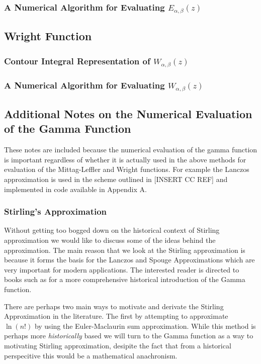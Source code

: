 \subsubsection{A Numerical Algorithm for Evaluating $ E_{\alpha, \beta}(z) $}
\subsection{Wright Function}
\subsubsection{Contour Integral Representation of $ W_{\alpha, \beta}(z) $}

\subsubsection{A Numerical Algorithm for Evaluating $ W_{\alpha, \beta}(z) $}

\subsection{Additional Notes on the Numerical Evaluation of the Gamma Function}
\label{sec:num-gamma}
These notes are included because the numerical evaluation of the gamma function is important regardless of
whether it is actually used in the above methods for evaluation of the Mittag-Leffler and Wright functions.
For example the Lanczos approximation is used in the scheme outlined in [INSERT CC REF] and implemented 
in code available in Appendix A.

\subsubsection{Stirling's Approximation}

Without getting too bogged down on the historical context of Stirling approximation we would like to discuss some of the ideas behind the approximation. The main reason that we look at the Stirling approximation is because it forms the basis for the Lanczos and Spouge Approximations which are very important for modern applications. The interested reader is directed to books such as \cite{Whittaker1996, Paris2001} for a more comprehensive historical introduction of the Gamma function.

There are perhaps two main ways to motivate and derivate the Stirling Approximation in the literature. The first by attempting to approximate $ \ln(n!) $ by using the Euler-Maclaurin sum approximation. While this method is perhaps more \emph{historically} based we will turn to the Gamma function as a way to motivating Stirling approximation, desipite the fact that from a historical perspecitive this would be a mathematical anachronism. 

